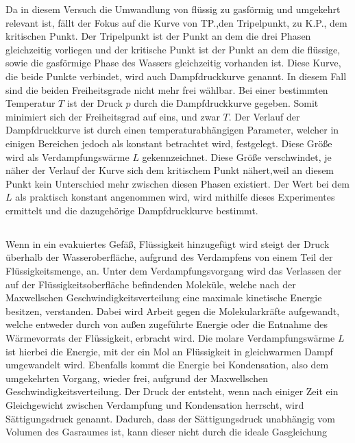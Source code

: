 \begin{flushleft}
    Da in diesem Versuch die Umwandlung von flüssig zu gasförmig und umgekehrt relevant ist, fällt der Fokus auf die Kurve von TP.,den Tripelpunkt, zu K.P., dem kritischen Punkt.
    Der Tripelpunkt ist der Punkt an dem die drei Phasen gleichzeitig vorliegen und der kritische Punkt ist der Punkt an dem die flüssige, sowie die gasförmige Phase des Wassers gleichzeitig vorhanden ist.
    Diese Kurve, die beide Punkte verbindet, wird auch Dampfdruckkurve genannt.
    In diesem Fall sind die beiden Freiheitsgrade nicht mehr frei wählbar. Bei einer bestimmten Temperatur $T$ ist der Druck $p$ durch die Dampfdruckkurve gegeben.
    Somit minimiert sich der Freiheitsgrad auf eins, und zwar $T$. 
    Der Verlauf der Dampfdruckkurve ist durch einen temperaturabhängigen Parameter, welcher in einigen Bereichen jedoch als konstant betrachtet wird, festgelegt. 
    Diese Größe wird als Verdampfungswärme $L$ gekennzeichnet.
    Diese Größe verschwindet, je näher der Verlauf der Kurve sich dem kritischem Punkt nähert,weil an diesem Punkt kein Unterschied mehr zwischen diesen Phasen existiert.
    Der Wert bei dem $L$ als praktisch konstant angenommen wird, wird mithilfe dieses Experimentes ermittelt und die dazugehörige Dampfdruckkurve bestimmt.
\end{flushleft}

\subsection{}

\begin{flushleft}
    Wenn in ein evakuiertes Gefäß, Flüssigkeit hinzugefügt wird steigt der Druck überhalb der Wasseroberfläche, aufgrund des Verdampfens von einem Teil der Flüssigkeitsmenge, an.
    Unter dem Verdampfungsvorgang wird das Verlassen der auf der Flüssigkeitsoberfläche befindenden Moleküle, welche nach der Maxwellschen Geschwindigkeitsverteilung eine maximale kinetische Energie besitzen, verstanden.
    Dabei wird Arbeit gegen die Molekularkräfte aufgewandt, welche entweder durch von außen zugeführte Energie oder die Entnahme des Wärmevorrats der Flüssigkeit, erbracht wird. 
    Die molare Verdampfungswärme $L$ ist hierbei die Energie, mit der ein Mol an Flüssigkeit in gleichwarmen Dampf umgewandelt wird. 
    Ebenfalls kommt die Energie bei Kondensation, also dem umgekehrten Vorgang, wieder frei, aufgrund der Maxwellschen Geschwindigkeitsverteilung.
    Der Druck der entsteht, wenn nach einiger Zeit ein Gleichgewicht zwischen Verdampfung und Kondensation herrscht, wird Sättigungsdruck genannt.
    Dadurch, dass der Sättigungsdruck unabhängig vom Volumen des Gasraumes ist, kann dieser nicht durch die ideale Gasgleichung
\end{flushleft}

